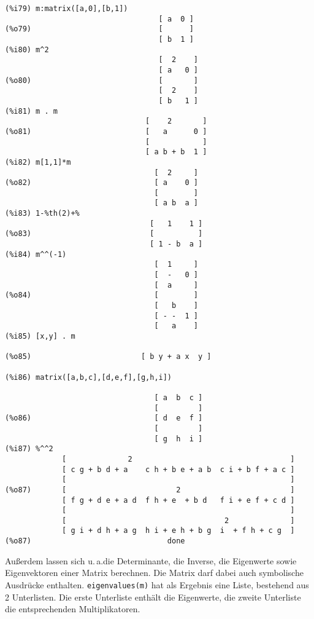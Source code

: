 \documentclass[ngerman,12pt]{scrartcl}
\newcommand*\ua{u.\,a.\xspace}
\begin{document}
\begin{verbatim}
(%i79) m:matrix([a,0],[b,1])
                                   [ a  0 ]
(%o79)                             [      ]
                                   [ b  1 ]
(%i80) m^2
                                   [  2    ]
                                   [ a   0 ]
(%o80)                             [       ]
                                   [  2    ]
                                   [ b   1 ]
(%i81) m . m
                                [    2       ]
(%o81)                          [   a      0 ]
                                [            ]
                                [ a b + b  1 ]
(%i82) m[1,1]*m
                                  [  2     ]
(%o82)                            [ a    0 ]
                                  [        ]
                                  [ a b  a ]
(%i83) 1-%th(2)+%
                                 [   1    1 ]
(%o83)                           [          ]
                                 [ 1 - b  a ]
(%i84) m^^(-1)
                                  [  1     ]
                                  [  -   0 ]
                                  [  a     ]
(%o84)                            [        ]
                                  [   b    ]
                                  [ - -  1 ]
                                  [   a    ]
(%i85) [x,y] . m

(%o85)                         [ b y + a x  y ]

(%i86) matrix([a,b,c],[d,e,f],[g,h,i])

                                  [ a  b  c ]
                                  [         ]
(%o86)                            [ d  e  f ]
                                  [         ]
                                  [ g  h  i ]
(%i87) %^^2
             [              2                                    ]
             [ c g + b d + a    c h + b e + a b  c i + b f + a c ]
             [                                                   ]
(%o87)       [                         2                         ]
             [ f g + d e + a d  f h + e  + b d   f i + e f + c d ]
             [                                                   ]
             [                                    2              ]
             [ g i + d h + a g  h i + e h + b g  i  + f h + c g  ]
(%o87)                               done
\end{verbatim}

Außerdem lassen sich \ua\@ die Determinante, die Inverse, die
Eigenwerte sowie Eigenvektoren einer Matrix berechnen. Die Matrix darf
dabei auch symbolische Ausdrücke enthalten. \texttt{eigenvalues(m)}
hat als Ergebnis eine Liste, bestehend aus 2 Unterlisten. Die erste
Unterliste enthält die Eigenwerte, die zweite Unterliste die
entsprechenden Multiplikatoren.
\end{document}
